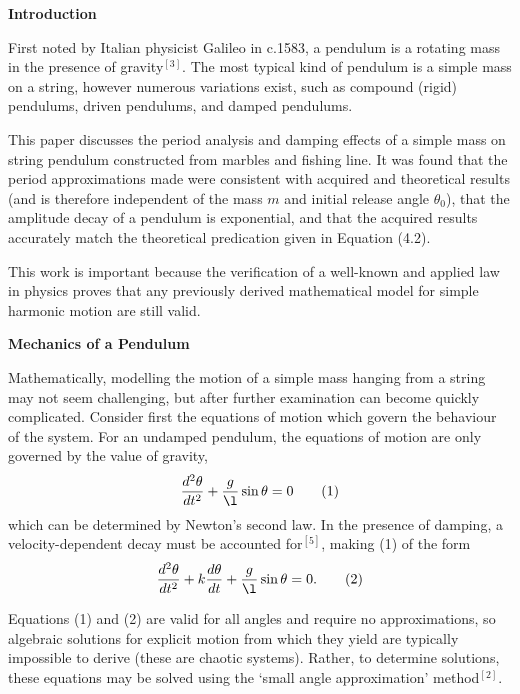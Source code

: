 \documentclass[11pt]{article}
\begin{document}
\begin{multicols}{2}


     \selectfont \textbf{Introduction}
    
     \selectfont First noted by Italian physicist Galileo in c.1583, a pendulum is a rotating mass in the presence of gravity$^{[3]}$. The most typical kind of pendulum is a simple mass on a string, however numerous variations exist, such as compound (rigid) pendulums, driven pendulums, and damped pendulums. 

    This paper discusses the period analysis and damping effects of a simple mass on string pendulum constructed from marbles and fishing line. It was found that the period approximations made were consistent with acquired and theoretical results (and is therefore independent of the mass $m$ and initial release angle $\theta_0$), that the amplitude decay of a pendulum is exponential, and that the acquired results accurately match the theoretical predication given in Equation (4.2).  

    This work is important because the verification of a well-known and applied law in physics proves that any previously derived mathematical model for simple harmonic motion are still valid.





    \vspace{10pt}

     \selectfont \textbf{Mechanics of a Pendulum}
    
     \selectfont Mathematically, modelling the motion of a simple mass hanging from a string may not seem challenging, but after further examination can become quickly complicated. Consider first the equations of motion which govern the behaviour of the system. For an undamped pendulum, the equations of motion are only governed by the value of gravity,
    \[
        \frac{d^2\theta}{dt^2} + \frac{g}{\l}\sin\theta  = 0 \tag{1}
    \]
    \nd which can be determined by Newton's second law. In the presence of damping, a velocity-dependent decay must be accounted for$^{[5]}$, making (1) of the form
    \[
        \frac{d^2\theta}{dt^2} + k\frac{d\theta}{dt} + \frac{g}{\l}\sin\theta  = 0. \tag{2}
    \]
    
    Equations (1) and (2) are valid for all angles and require no approximations, so algebraic solutions for explicit motion from which they yield are typically impossible to derive (these are chaotic systems). Rather, to determine solutions, these equations may be solved using the `small angle approximation' method$^{[2]}$. 
    

\end{multicols}
\end{document}
